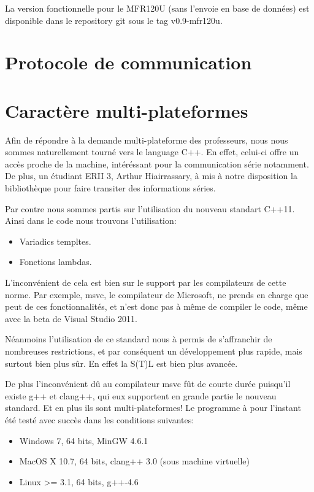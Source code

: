     La version fonctionnelle pour le MFR120U (sans l'envoie en base de données)
est disponible dans le repository git sous le tag v0.9-mfr120u.


\section{Protocole de communication}




\section{Caractère multi-plateformes}
    Afin de répondre à la demande multi-plateforme des professeurs, nous nous 
sommes naturellement tourné vers le language C++. En effet, celui-ci offre un accès
proche de la machine, intéréssant pour la communication série notamment. De plus,
un étudiant ERII 3, Arthur Hiairrassary, à mis à notre disposition la bibliothèque
pour faire transiter des informations séries.

    Par contre nous sommes partis sur l'utilisation du nouveau standart C++11. Ainsi
dans le code nous trouvons l'utilisation:

    \begin{itemize}
        \item Variadics templtes.
        \item Fonctions lambdas.
    \end{itemize}

    L'inconvénient de cela est bien sur le support par les compilateurs de cette
norme. Par exemple, msvc, le compilateur de Microsoft, ne prends en charge que peut
de ces fonctionnalités, et n'est donc pas à même de compiler le code, même avec la
beta de Visual Studio 2011.

    Néanmoins l'utilisation de ce standard nous à permis de s'affranchir de nombreuses
restrictions, et par conséquent un développement plus rapide, mais surtout bien
plus sûr. En effet la S(T)L est bien plus avancée.

    De plus l'inconvénient dû au compilateur msvc fût de courte durée puisqu'il
existe g++ et clang++, qui eux supportent en grande partie le nouveau standard.
Et en plus ils sont multi-plateformes! Le programme à pour l'instant été testé 
avec succès dans les conditions suivantes:

    \begin{itemize}
        \item Windows 7, 64 bits, MinGW 4.6.1
        \item MacOS X 10.7, 64 bits, clang++ 3.0 (sous machine virtuelle)
        \item Linux >= 3.1, 64 bits, g++-4.6
    \end{itemize}

